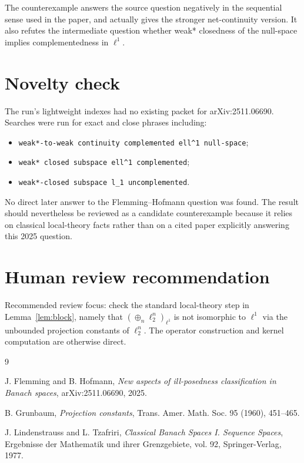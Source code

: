 \documentclass[11pt]{article}
\newcommand{\ellone}{\ell^1}
\newcommand{\Hn}{\ell_2^n}
\begin{document}
The counterexample answers the source question negatively in the sequential
sense used in the paper, and actually gives the stronger net-continuity
version.  It also refutes the intermediate question whether weak* closedness of
the null-space implies complementedness in $\ellone$.

\section*{Novelty check}

The run's lightweight indexes had no existing packet for arXiv:2511.06690.
Searches were run for exact and close phrases including:
\begin{itemize}
\item \texttt{weak*-to-weak continuity complemented ell\^{}1 null-space};
\item \texttt{weak* closed subspace ell\^{}1 complemented};
\item \texttt{weak*-closed subspace l\_1 uncomplemented}.
\end{itemize}
No direct later answer to the Flemming--Hofmann question was found.  The result
should nevertheless be reviewed as a candidate counterexample because it relies
on classical local-theory facts rather than on a cited paper explicitly
answering this 2025 question.

\section*{Human review recommendation}

Recommended review focus: check the standard local-theory step in
Lemma~\ref{lem:block}, namely that
$(\oplus_n \Hn)_{\ellone}$ is not isomorphic to $\ellone$ via the
unbounded projection constants of $\Hn$.  The operator construction and
kernel computation are otherwise direct.

\begin{thebibliography}{9}

J. Flemming and B. Hofmann,
\emph{New aspects of ill-posedness classification in Banach spaces},
arXiv:2511.06690, 2025.

B. Grunbaum,
\emph{Projection constants},
Trans. Amer. Math. Soc. 95 (1960), 451--465.

J. Lindenstrauss and L. Tzafriri,
\emph{Classical Banach Spaces I. Sequence Spaces},
Ergebnisse der Mathematik und ihrer Grenzgebiete, vol. 92,
Springer-Verlag, 1977.

\end{thebibliography}
\end{document}
